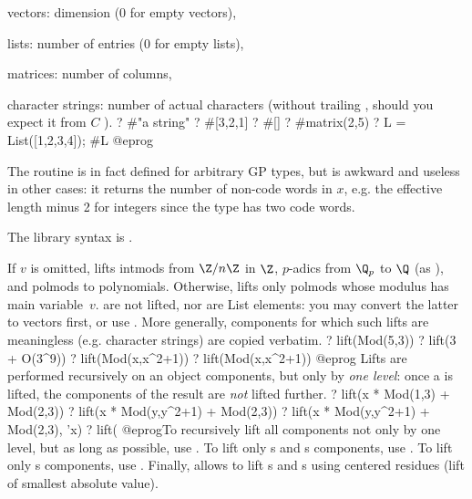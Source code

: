 \item vectors: dimension (0 for empty vectors),

\item lists: number of entries (0 for empty lists),

\item matrices: number of columns,

\item character strings: number of actual characters (without
trailing , should you expect it from $C$ ).
\bprog
 ? #"a string"
 ? #[3,2,1]
 ? #[]
 ? #matrix(2,5)
 ? L = List([1,2,3,4]); #L
@eprog

The routine is in fact defined for arbitrary GP types, but is awkward and
useless in other cases: it returns the number of non-code words in $x$, e.g.
the effective length minus 2 for integers since the  type has two code
words.

The library syntax is .

\label{se:lift}
If $v$ is omitted, lifts intmods from $\Z/n\Z$ in $\Z$,
$p$-adics from $\Q_p$ to $\Q$ (as ), and polmods to
polynomials. Otherwise, lifts only polmods whose modulus has main
variable~$v$.  are not lifted, nor are List elements: you may
convert the latter to vectors first, or use . More
generally, components for which such lifts are meaningless (e.g. character
strings) are copied verbatim.
\bprog
? lift(Mod(5,3))
? lift(3 + O(3^9))
? lift(Mod(x,x^2+1))
? lift(Mod(x,x^2+1))
@eprog
Lifts are performed recursively on an object components, but only
by \emph{one level}: once a  is lifted, the components of
the result are \emph{not} lifted further.
\bprog
? lift(x * Mod(1,3) + Mod(2,3))
? lift(x * Mod(y,y^2+1) + Mod(2,3))
? lift(x * Mod(y,y^2+1) + Mod(2,3), 'x)
? lift(%
@eprog\noindent To recursively lift all components not only by one level,
but as long as possible, use . To lift only s and
s components, use . To lift only s
components, use . Finally,  allows to lift
s and s using centered residues (lift of smallest
absolute value).

